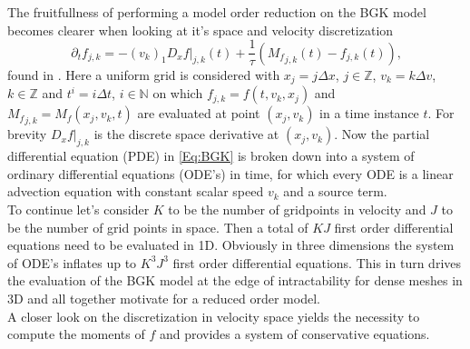 The fruitfullness of performing a model order reduction on the BGK model becomes clearer when looking at it's space and velocity discretization
\begin{equation}
	\partial_t f_{j,k} = -(v_k)_1D_x f|_{j,k}(t) + \frac{1}{\tau}({M_f}_{j,k}(t) - f_{j,k}(t)) \text{,}
	\label{Eq:Discrete BGK}
\end{equation}
found in \cite{puppo2019kinetic}. Here a uniform grid is considered with \(x_j = j\Delta x\), \(j \in \mathbb{Z}\), \(v_k = k\Delta v\), \(k \in \mathbb{Z}\) and \(t^i = i \Delta t\), \(i \in \mathbb{N}\) on which \(f_{j,k} = f(t,v_k,x_j)\) and \({M_f}_{j,k} = M_f(x_j,v_k,t)\) are evaluated at point \((x_j,v_k)\) in a time instance \(t\). For brevity \(D_x f|_{j,k}\) is the discrete space derivative at \((x_j,v_k)\). Now the partial differential equation (PDE) in \cref{Eq:BGK} is broken down into a system of ordinary differential equations (ODE's) in time, for which every ODE is a linear advection equation with constant scalar speed \(v_k\) and a source term.\\

To continue let's consider \(K\) to be the number of gridpoints in velocity and \(J\) to be the number of grid points in space. Then a total of \(KJ\) first order differential equations need to be evaluated in 1D. Obviously in three dimensions the system of ODE's inflates up to \(K^3J^3\) first order differential equations. This in turn drives the evaluation of the BGK model at the edge of intractability for dense meshes in 3D and all together motivate for a reduced order model.\\
A closer look on the discretization in velocity space yields the necessity to compute the moments of \(f\) and provides a system of conservative equations.\\  

